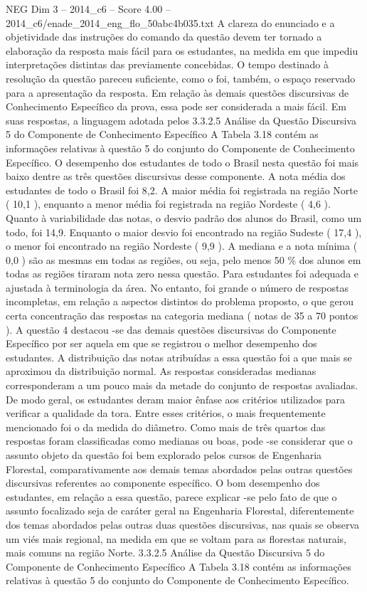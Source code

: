 \begin{textsample}{NEG Dim 3 – 2014\_c6 – Score 4.00 – 2014\_c6/enade\_2014\_eng\_flo\_50abc4b035.txt}
A clareza do enunciado e a objetividade das instruções do comando da questão devem ter tornado a elaboração da resposta mais fácil para os estudantes, na medida em que impediu interpretações distintas das previamente concebidas.
O tempo destinado à resolução da questão pareceu suficiente, como o foi, também, o espaço reservado para a apresentação da resposta.
Em relação às demais questões discursivas de Conhecimento Específico da prova, essa pode ser considerada a mais fácil.
Em suas respostas, a linguagem adotada pelos 3.3.2.5 Análise da Questão Discursiva 5 do Componente de Conhecimento Específico A Tabela 3.18 contém as informações relativas à questão 5 do conjunto do Componente de Conhecimento Específico.
O desempenho dos estudantes de todo o Brasil nesta questão foi mais baixo dentre as três questões discursivas desse componente.
A nota média dos estudantes de todo o Brasil foi 8,2.
A maior média foi registrada na região Norte ( 10,1 ), enquanto a menor média foi registrada na região Nordeste ( 4,6 ).
Quanto à variabilidade das notas, o desvio padrão dos alunos do Brasil, como um todo, foi 14,9.
Enquanto o maior desvio foi encontrado na região Sudeste ( 17,4 ), o menor foi encontrado na região Nordeste ( 9,9 ).
A mediana e a nota mínima ( 0,0 ) são as mesmas em todas as regiões, ou seja, pelo menos 50 \% dos alunos em todas as regiões tiraram nota zero nessa questão.
Para estudantes foi adequada e ajustada à terminologia da área.
No entanto, foi grande o número de respostas incompletas, em relação a aspectos distintos do problema proposto, o que gerou certa concentração das respostas na categoria mediana ( notas de 35 a 70 pontos ).
A questão 4 destacou -se das demais questões discursivas do Componente Específico por ser aquela em que se registrou o melhor desempenho dos estudantes.
A distribuição das notas atribuídas a essa questão foi a que mais se aproximou da distribuição normal.
As respostas consideradas medianas corresponderam a um pouco mais da metade do conjunto de respostas avaliadas.
De modo geral, os estudantes deram maior ênfase aos critérios utilizados para verificar a qualidade da tora.
Entre esses critérios, o mais frequentemente mencionado foi o da medida do diâmetro.
Como mais de três quartos das respostas foram classificadas como medianas ou boas, pode -se considerar que o assunto objeto da questão foi bem explorado pelos cursos de Engenharia Florestal, comparativamente aos demais temas abordados pelas outras questões discursivas referentes ao componente específico.
O bom desempenho dos estudantes, em relação a essa questão, parece explicar -se pelo fato de que o assunto focalizado seja de caráter geral na Engenharia Florestal, diferentemente dos temas abordados pelas outras duas questões discursivas, nas quais se observa um viés mais regional, na medida em que se voltam para as florestas naturais, mais comuns na região Norte. 3.3.2.5 Análise da Questão Discursiva 5 do Componente de Conhecimento Específico A Tabela 3.18 contém as informações relativas à questão 5 do conjunto do Componente de Conhecimento Específico.

\end{textsample}
